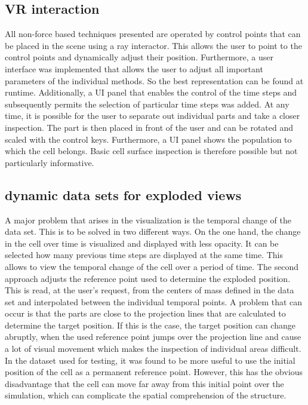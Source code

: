 \subsection{VR interaction}

All non-force based techniques presented are operated by control points that can be placed in the scene using a ray interactor. 
This allows the user to point to the control points and dynamically adjust their position. %
Furthermore, a user interface was implemented that allows the user to adjust all important parameters of the individual methods. 
So the best representation can be found at runtime.  
Additionally, a UI panel that enables the control of the time steps and subsequently permits the selection of particular time steps was added.
At any time, it is possible for the user to separate out individual parts and take a closer inspection. 
The part is then placed in front of the user and can be rotated and scaled with the control keys. Furthermore, a UI panel shows the population to which the cell belongs. 
Basic cell surface inspection is therefore possible but not particularly informative. 

\subsection{dynamic data sets for exploded views}

A major problem that arises in the visualization is the temporal change of the data set. This is to be solved in two different ways.
On the one hand, the change in the cell over time is visualized and displayed with less opacity.
It can be selected how many previous time steps are displayed at the same time.
This allows to view the temporal change of the cell over a period of time. %
The second approach adjusts the reference point used to determine the exploded position. 
This is read, at the user's request, from the centers of mass defined in the data set and interpolated between the individual temporal points. A problem that can occur is that the parts are close to the projection lines that are calculated to determine the target position. 
If this is the case, the target position can change abruptly, when the used reference point jumps over the projection line and cause a lot of visual movement which makes the inspection of individual areas difficult.  
In the dataset used for testing, it was found to be more useful to use the initial position of the cell as a permanent reference point. 
However, this has the obvious disadvantage that the cell can move far away from this initial point over the simulation, which can complicate the spatial comprehension of the structure. 



